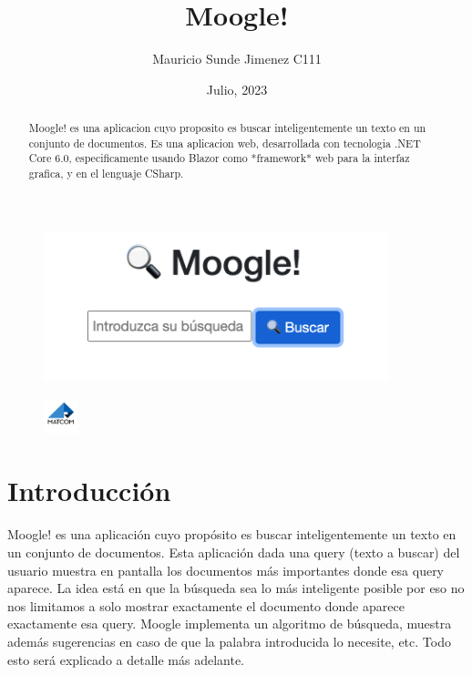 \documentclass[a4paper,12pt]{article}
\begin{document}
\title{Moogle!}
\author{Mauricio Sunde Jimenez C111}
\date{Julio, 2023}
\maketitle

\begin{figure}[h]
    \center
    \includegraphics[width=10cm]{Pictures For Moogle!/Picture1.png}
\end{figure}

\begin{figure}[h]
    \center
    \includegraphics[width=1cm]{Pictures For Moogle!/matcom.jpg}
    \label{fig:logo}
\end{figure}

\begin{abstract}
    Moogle! es una aplicacion cuyo proposito es buscar inteligentemente un texto en un conjunto de documentos. Es una aplicacion web, desarrollada con tecnologia .NET Core 6.0, especificamente usando Blazor como *framework* web para la interfaz grafica, y en el lenguaje CSharp.
\end{abstract}

\section {Introducción}\label{sec:intro}

Moogle! es una aplicación cuyo propósito es buscar inteligentemente un texto en un conjunto de documentos. Esta aplicación dada una query (texto a buscar) del usuario muestra en pantalla los documentos más importantes donde esa query aparece. La idea está en que la búsqueda sea lo más inteligente posible por eso no nos limitamos a solo mostrar exactamente el documento donde aparece exactamente esa query. Moogle implementa un algoritmo de búsqueda, muestra además sugerencias en caso de que la palabra introducida lo necesite, etc. Todo esto será explicado a detalle más adelante.
\end{document}
